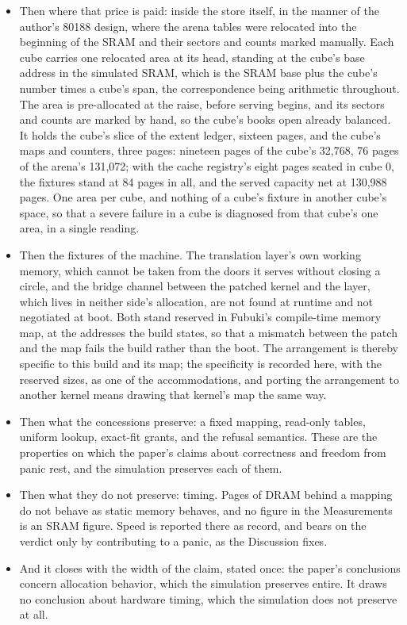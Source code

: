 \documentclass[11pt]{article}
\begin{document}
\begin{itemize}
\item Then where that price is paid: inside the store itself, in the manner of the author's 80188 design, where the arena tables were relocated into the beginning of the SRAM and their sectors and counts marked manually. Each cube carries one relocated area at its head, standing at the cube's base address in the simulated SRAM, which is the SRAM base plus the cube's number times a cube's span, the correspondence being arithmetic throughout. The area is pre-allocated at the raise, before serving begins, and its sectors and counts are marked by hand, so the cube's books open already balanced. It holds the cube's slice of the extent ledger, sixteen pages, and the cube's maps and counters, three pages: nineteen pages of the cube's 32,768, 76 pages of the arena's 131,072; with the cache registry's eight pages seated in cube 0, the fixtures stand at 84 pages in all, and the served capacity net at 130,988 pages. One area per cube, and nothing of a cube's fixture in another cube's space, so that a severe failure in a cube is diagnosed from that cube's one area, in a single reading.
\item Then the fixtures of the machine. The translation layer's own working memory, which cannot be taken from the doors it serves without closing a circle, and the bridge channel between the patched kernel and the layer, which lives in neither side's allocation, are not found at runtime and not negotiated at boot. Both stand reserved in Fubuki's compile-time memory map, at the addresses the build states, so that a mismatch between the patch and the map fails the build rather than the boot. The arrangement is thereby specific to this build and its map; the specificity is recorded here, with the reserved sizes, as one of the accommodations, and porting the arrangement to another kernel means drawing that kernel's map the same way.
\item Then what the concessions preserve: a fixed mapping, read-only tables, uniform lookup, exact-fit grants, and the refusal semantics. These are the properties on which the paper's claims about correctness and freedom from panic rest, and the simulation preserves each of them.
\item Then what they do not preserve: timing. Pages of DRAM behind a mapping do not behave as static memory behaves, and no figure in the Measurements is an SRAM figure. Speed is reported there as record, and bears on the verdict only by contributing to a panic, as the Discussion fixes.
\item And it closes with the width of the claim, stated once: the paper's conclusions concern allocation behavior, which the simulation preserves entire. It draws no conclusion about hardware timing, which the simulation does not preserve at all.
\end{itemize}
\end{document}
